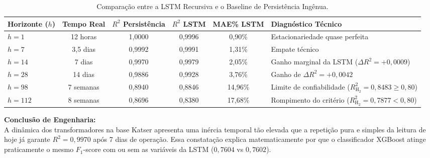 \documentclass[11pt,a4paper]{article}
\begin{document}
\begin{table}[htbp]
  \centering\small
  \caption{Comparação entre a LSTM Recursiva e o Baseline de Persistência Ingênua.}
  \label{tab:lstm_vs_persist}
  \begin{tabularx}{\textwidth}{l c c c c X}
    \toprule
    \textbf{Horizonte ($h$)} & \textbf{Tempo Real} & \textbf{$R^2$ Persistência} & \textbf{$R^2$ LSTM} & \textbf{MAE\% LSTM} & \textbf{Diagnóstico Técnico} \\
    \midrule
    $h = 1$ & 12 horas & 1,0000 & 0,9996 & 0,90\% & Estacionariedade quase perfeita \\
    $h = 7$ & 3,5 dias & 0,9992 & 0,9991 & 1,31\% & Empate técnico \\
    $h = 14$ & 7 dias & 0,9970 & 0,9979 & 2,05\% & Ganho marginal da LSTM ($\Delta R^2 = +0,0009$) \\
    $h = 28$ & 14 dias & 0,9886 & 0,9928 & 3,76\% & Ganho de $\Delta R^2 = +0,0042$ \\
    $h = 98$ & 7 semanas & 0,8940 & 0,8846 & 14,96\% & Limite de confiabilidade ($R^2_{\text{H}_2} = 0,8483 \ge 0,80$) \\
    $h = 112$ & 8 semanas & 0,8696 & 0,8380 & 17,68\% & Rompimento do critério ($R^2_{\text{H}_2} = 0,7877 < 0,80$) \\
    \bottomrule
  \end{tabularx}
\end{table}

\textbf{Conclusão de Engenharia:}\\
A dinâmica dos transformadores na base Katser apresenta uma inércia temporal tão elevada que a repetição pura e simples da leitura de hoje já garante $R^2 = 0{,}9970$ após 7 dias de operação. Essa constatação explica matematicamente por que o classificador XGBoost atinge praticamente o mesmo $F_1$-score com ou sem as variáveis da LSTM ($0{,}7604$ vs $0{,}7602$).
\end{document}
